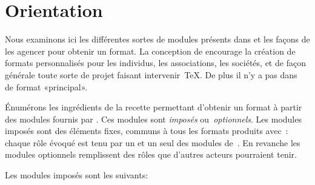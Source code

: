 
%




\section{Orientation}

Nous examinons ici les différentes sortes de modules présents dans
{\brTeX} et les façons de les agencer pour obtenir un format. La
conception de {\brTeX} encourage la création de formats personnalisés
pour les individus, les associations, les sociétés, et de façon
générale toute sorte de projet faisant intervenir~{\TeX}. De plus il n'y
a pas dans~{\brTeX} de format «principal».

Énumérons les ingrédients de la recette permettant d'obtenir un format à
partir des modules fournis par {\brTeX}.  Ces modules sont
\emph{imposés} ou~\emph{optionnels}.
Les modules imposés sont des éléments fixes, communs à
tous les formats produits avec~{\brTeX}: chaque rôle évoqué est tenu par
un et un seul des modules de~{\brTeX}.   En revanche les modules
optionnels remplissent des rôles que d'autres acteurs pourraient
tenir.

Les modules imposés sont les suivants:

